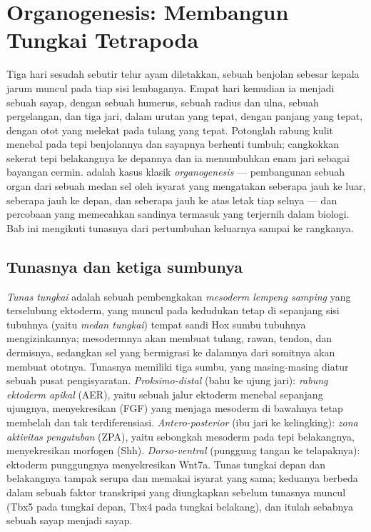 \chapter{Organogenesis: Membangun Tungkai Tetrapoda}\label{ch:b2:limb-organogenesis}

Tiga hari sesudah sebutir telur ayam diletakkan, sebuah benjolan
sebesar kepala jarum muncul pada tiap sisi lembaganya. Empat hari
kemudian ia menjadi sebuah sayap, dengan sebuah humerus, sebuah radius
dan ulna, sebuah pergelangan, dan tiga jari, dalam urutan yang tepat,
dengan panjang yang tepat, dengan otot yang melekat pada tulang yang
tepat. Potonglah rabung kulit menebal pada tepi benjolannya dan
sayapnya berhenti tumbuh; cangkokkan sekerat tepi belakangnya ke
depannya dan ia menumbuhkan enam jari sebagai bayangan cermin.  adalah kasus klasik \emph{organogenesis} --- pembangunan sebuah
organ dari sebuah medan sel oleh isyarat yang mengatakan seberapa jauh
ke luar, seberapa jauh ke depan, dan seberapa jauh ke atas letak tiap
selnya --- dan percobaan yang memecahkan sandinya termasuk yang
terjernih dalam biologi. Bab ini mengikuti tunasnya dari pertumbuhan
keluarnya sampai ke rangkanya.

\section{Tunasnya dan ketiga sumbunya}

\begin{definition}\label{def:b2:limb-organogenesis:bud}
%
\emph{Tunas tungkai} adalah sebuah pembengkakan \emph{mesoderm lempeng
samping} yang terselubung ektoderm, yang muncul pada kedudukan tetap di
sepanjang sisi tubuhnya (yaitu \emph{medan tungkai}) tempat sandi Hox
sumbu tubuhnya mengizinkannya; mesodermnya akan membuat tulang, rawan,
tendon, dan dermisnya, sedangkan sel yang bermigrasi ke dalamnya dari
somitnya akan membuat ototnya. Tunasnya memiliki tiga sumbu, yang
masing-masing diatur sebuah pusat pengisyaratan.
\emph{Proksimo-distal} (bahu ke ujung jari): \emph{rabung ektoderm
apikal} (AER), yaitu sebuah jalur ektoderm menebal sepanjang ujungnya,
menyekresikan  (FGF) yang menjaga
mesoderm di bawahnya tetap membelah dan tak terdiferensiasi.
\emph{Antero-posterior} (ibu jari ke kelingking): \emph{zona
aktivitas pengutuban} (ZPA), yaitu sebongkah mesoderm pada tepi
belakangnya, menyekresikan morfogen \emph{} (Shh).
\emph{Dorso-ventral} (punggung tangan ke telapaknya): ektoderm
punggungnya menyekresikan Wnt7a. Tunas tungkai depan dan belakangnya
tampak serupa dan memakai isyarat yang sama; keduanya berbeda dalam
sebuah faktor transkripsi yang diungkapkan sebelum tunasnya muncul
(Tbx5 pada tungkai depan, Tbx4 pada tungkai belakang), dan itulah
sebabnya sebuah sayap menjadi sayap.
\end{definition}

